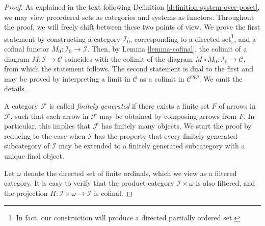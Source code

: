 \begin{proof}
As explained in the text following
Definition \ref{definition-system-over-poset}, we may view
preordered sets as categories and systems as functors.
Throughout the proof, we will freely shift between these two points of view.
We prove the first statement by constructing a category
$\mathcal{I}_0$, corresponding to a directed set\footnote{In fact,
our construction will produce a directed partially ordered set.}, and a cofinal
functor $M_0 : \mathcal{I}_0 \to \mathcal{I}$. Then, by
Lemma \ref{lemma-cofinal}, the colimit of a diagram
$M : \mathcal{I} \to \mathcal{C}$ coincides with the
colimit of the diagram $M \circ M_0 : \mathcal{I}_0 \to \mathcal{C}$,
from which the statement follows. The second statement is dual to the
first and may be proved by interpreting a limit in $\mathcal{C}$ as
a colimit in $\mathcal{C}^{opp}$. We omit the details.

\medskip\noindent
A category $\mathcal{F}$ is called {\em finitely generated} if
there exists a finite set $F$ of arrows in $\mathcal{F}$, such that
each arrow in $\mathcal{F}$ may be obtained by composing
arrows from $F$. In particular, this implies that $\mathcal{F}$ has
finitely many objects. We start the proof by reducing to the case
when $\mathcal{I}$ has the property that every finitely generated
subcategory of $\mathcal{I}$ may be extended to a finitely
generated subcategory with a unique final object.

\medskip\noindent
Let $\omega$ denote the directed set of finite ordinals, which
we view as a filtered category. It is easy to verify that the
product category $\mathcal{I}\times \omega$ is also filtered,
and the projection
$\Pi : \mathcal{I} \times \omega \to \mathcal{I}$
is cofinal.


\end{proof}
